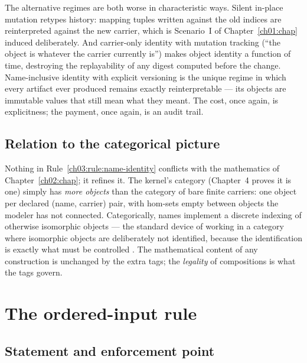 The alternative regimes are both worse in characteristic ways. Silent
in-place mutation retypes history: mapping tuples written against the
old indices are reinterpreted against the new carrier, which is
Scenario~I of Chapter~\ref{ch01:chap} induced deliberately. And
carrier-only identity with mutation tracking (``the object is whatever
the carrier currently is'') makes object identity a function of time,
destroying the replayability of any digest computed before the change.
Name-inclusive identity with explicit versioning is the unique regime in
which every artifact ever produced remains exactly reinterpretable ---
its objects are immutable values that still mean what they meant. The
cost, once again, is explicitness; the payment, once again, is an audit
trail.

\subsection{Relation to the categorical picture}

Nothing in Rule~\ref{ch03:rule:name-identity} conflicts with the
mathematics of Chapter~\ref{ch02:chap}; it refines it. The kernel's
category (Chapter~4 proves it is one) simply has \emph{more objects} than
the category of bare finite carriers: one object per declared (name,
carrier) pair, with hom-sets empty between objects the modeler has not
connected. Categorically, names implement a discrete indexing of otherwise
isomorphic objects --- the standard device of working in a category where
isomorphic objects are deliberately not identified, because the
identification is exactly what must be controlled \cite{maclanecwm}. The
mathematical content of any construction is unchanged by the extra tags;
the \emph{legality} of compositions is what the tags govern.

\section{The ordered-input rule}\label{ch03:sec:ordered-rule}

\subsection{Statement and enforcement point}

